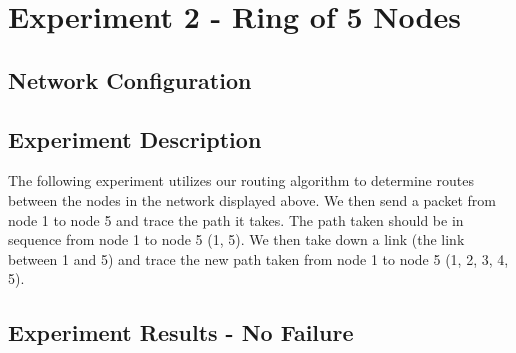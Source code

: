 \documentclass[fleqn,11pt]{article}
\begin{document}
\section{Experiment 2 - Ring of 5 Nodes}
  \subsection{Network Configuration}
    
  \subsection{Experiment Description}
    The following experiment utilizes our routing algorithm to determine routes
    between the nodes in the network displayed above. We then send a packet
    from node 1 to node 5 and trace the path it takes. The path taken should be
    in sequence from node 1 to node 5 (1, 5). We then take down a link
    (the link between 1 and 5) and trace the new path taken from node 1 to
    node 5 (1, 2, 3, 4, 5).

  \subsection{Experiment Results - No Failure}
\end{document}
